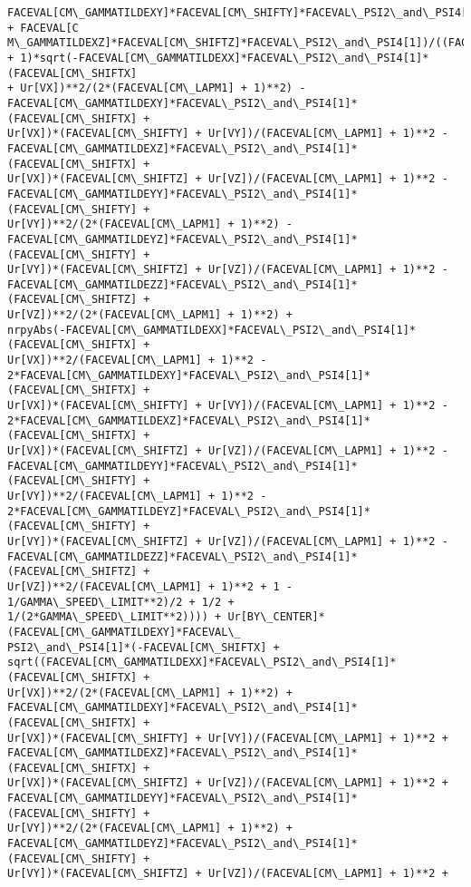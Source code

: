 \documentclass[landscape,letterpaper,10pt,english]{article}
\begin{document}
\begin{Verbatim}[commandchars=\\\{\}]
FACEVAL[CM\_GAMMATILDEXY]*FACEVAL[CM\_SHIFTY]*FACEVAL\_PSI2\_and\_PSI4[1] + FACEVAL[C
M\_GAMMATILDEXZ]*FACEVAL[CM\_SHIFTZ]*FACEVAL\_PSI2\_and\_PSI4[1])/((FACEVAL[CM\_LAPM1]
+ 1)*sqrt(-FACEVAL[CM\_GAMMATILDEXX]*FACEVAL\_PSI2\_and\_PSI4[1]*(FACEVAL[CM\_SHIFTX]
+ Ur[VX])**2/(2*(FACEVAL[CM\_LAPM1] + 1)**2) -
FACEVAL[CM\_GAMMATILDEXY]*FACEVAL\_PSI2\_and\_PSI4[1]*(FACEVAL[CM\_SHIFTX] +
Ur[VX])*(FACEVAL[CM\_SHIFTY] + Ur[VY])/(FACEVAL[CM\_LAPM1] + 1)**2 -
FACEVAL[CM\_GAMMATILDEXZ]*FACEVAL\_PSI2\_and\_PSI4[1]*(FACEVAL[CM\_SHIFTX] +
Ur[VX])*(FACEVAL[CM\_SHIFTZ] + Ur[VZ])/(FACEVAL[CM\_LAPM1] + 1)**2 -
FACEVAL[CM\_GAMMATILDEYY]*FACEVAL\_PSI2\_and\_PSI4[1]*(FACEVAL[CM\_SHIFTY] +
Ur[VY])**2/(2*(FACEVAL[CM\_LAPM1] + 1)**2) -
FACEVAL[CM\_GAMMATILDEYZ]*FACEVAL\_PSI2\_and\_PSI4[1]*(FACEVAL[CM\_SHIFTY] +
Ur[VY])*(FACEVAL[CM\_SHIFTZ] + Ur[VZ])/(FACEVAL[CM\_LAPM1] + 1)**2 -
FACEVAL[CM\_GAMMATILDEZZ]*FACEVAL\_PSI2\_and\_PSI4[1]*(FACEVAL[CM\_SHIFTZ] +
Ur[VZ])**2/(2*(FACEVAL[CM\_LAPM1] + 1)**2) +
nrpyAbs(-FACEVAL[CM\_GAMMATILDEXX]*FACEVAL\_PSI2\_and\_PSI4[1]*(FACEVAL[CM\_SHIFTX] +
Ur[VX])**2/(FACEVAL[CM\_LAPM1] + 1)**2 -
2*FACEVAL[CM\_GAMMATILDEXY]*FACEVAL\_PSI2\_and\_PSI4[1]*(FACEVAL[CM\_SHIFTX] +
Ur[VX])*(FACEVAL[CM\_SHIFTY] + Ur[VY])/(FACEVAL[CM\_LAPM1] + 1)**2 -
2*FACEVAL[CM\_GAMMATILDEXZ]*FACEVAL\_PSI2\_and\_PSI4[1]*(FACEVAL[CM\_SHIFTX] +
Ur[VX])*(FACEVAL[CM\_SHIFTZ] + Ur[VZ])/(FACEVAL[CM\_LAPM1] + 1)**2 -
FACEVAL[CM\_GAMMATILDEYY]*FACEVAL\_PSI2\_and\_PSI4[1]*(FACEVAL[CM\_SHIFTY] +
Ur[VY])**2/(FACEVAL[CM\_LAPM1] + 1)**2 -
2*FACEVAL[CM\_GAMMATILDEYZ]*FACEVAL\_PSI2\_and\_PSI4[1]*(FACEVAL[CM\_SHIFTY] +
Ur[VY])*(FACEVAL[CM\_SHIFTZ] + Ur[VZ])/(FACEVAL[CM\_LAPM1] + 1)**2 -
FACEVAL[CM\_GAMMATILDEZZ]*FACEVAL\_PSI2\_and\_PSI4[1]*(FACEVAL[CM\_SHIFTZ] +
Ur[VZ])**2/(FACEVAL[CM\_LAPM1] + 1)**2 + 1 - 1/GAMMA\_SPEED\_LIMIT**2)/2 + 1/2 +
1/(2*GAMMA\_SPEED\_LIMIT**2)))) + Ur[BY\_CENTER]*(FACEVAL[CM\_GAMMATILDEXY]*FACEVAL\_
PSI2\_and\_PSI4[1]*(-FACEVAL[CM\_SHIFTX] +
sqrt((FACEVAL[CM\_GAMMATILDEXX]*FACEVAL\_PSI2\_and\_PSI4[1]*(FACEVAL[CM\_SHIFTX] +
Ur[VX])**2/(2*(FACEVAL[CM\_LAPM1] + 1)**2) +
FACEVAL[CM\_GAMMATILDEXY]*FACEVAL\_PSI2\_and\_PSI4[1]*(FACEVAL[CM\_SHIFTX] +
Ur[VX])*(FACEVAL[CM\_SHIFTY] + Ur[VY])/(FACEVAL[CM\_LAPM1] + 1)**2 +
FACEVAL[CM\_GAMMATILDEXZ]*FACEVAL\_PSI2\_and\_PSI4[1]*(FACEVAL[CM\_SHIFTX] +
Ur[VX])*(FACEVAL[CM\_SHIFTZ] + Ur[VZ])/(FACEVAL[CM\_LAPM1] + 1)**2 +
FACEVAL[CM\_GAMMATILDEYY]*FACEVAL\_PSI2\_and\_PSI4[1]*(FACEVAL[CM\_SHIFTY] +
Ur[VY])**2/(2*(FACEVAL[CM\_LAPM1] + 1)**2) +
FACEVAL[CM\_GAMMATILDEYZ]*FACEVAL\_PSI2\_and\_PSI4[1]*(FACEVAL[CM\_SHIFTY] +
Ur[VY])*(FACEVAL[CM\_SHIFTZ] + Ur[VZ])/(FACEVAL[CM\_LAPM1] + 1)**2 +

\end{Verbatim}
\end{document}
